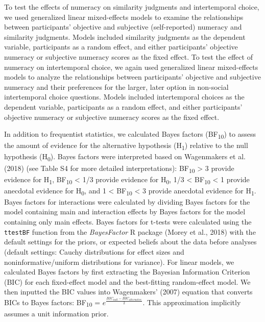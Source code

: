 \documentclass[
  pub,floatsintext]{apa6}
\begin{document}
To test the effects of numeracy on similarity judgments and intertemporal choice, we used generalized linear mixed-effects models to examine the relationships between participants' objective and subjective (self-reported) numeracy and similarity judgments. Models included similarity judgments as the dependent variable, participants as a random effect, and either participants' objective numeracy or subjective numeracy scores as the fixed effect. To test the effect of numeracy on intertemporal choice, we again used generalized linear mixed-effects models to analyze the relationships between participants' objective and subjective numeracy and their preferences for the larger, later option in non-social intertemporal choice questions. Models included intertemporal choices as the dependent variable, participants as a random effect, and either participants' objective numeracy or subjective numeracy scores as the fixed effect.

In addition to frequentist statistics, we calculated Bayes factors (BF\textsubscript{10}) to assess the amount of evidence for the alternative hypothesis (H\textsubscript{1}) relative to the null hypothesis (H\textsubscript{0}). Bayes factors were interpreted based on Wagenmakers et al. (2018) (see Table S4 for more detailed interpretations): BF\textsubscript{10} \textgreater{} 3 provide evidence for H\textsubscript{1}, BF\textsubscript{10} \textless{} 1/3 provide evidence for H\textsubscript{0}, 1/3 \textless{} BF\textsubscript{10} \textless{} 1 provide anecdotal evidence for H\textsubscript{0}, and 1 \textless{} BF\textsubscript{10} \textless{} 3 provide anecdotal evidence for H\textsubscript{1}. Bayes factors for interactions were calculated by dividing Bayes factors for the model containing main and interaction effects by Bayes factors for the model containing only main effects. Bayes factors for t-tests were calculated using the \texttt{ttestBF} function from the \emph{BayesFactor} R package (Morey et al., 2018) with the default settings for the priors, or expected beliefs about the data before analyses (default settings: Cauchy distributions for effect sizes and noninformative/uniform distributions for variance). For linear models, we calculated Bayes factors by first extracting the Bayesian Information Criterion (BIC) for each fixed-effect model and the best-fitting random-effect model. We then inputted the BIC values into Wagenmakers' (2007) equation that converts BICs to Bayes factors: BF\textsubscript{10} = \(e^{\frac{BIC_{null} - BIC_{alternative}}{2}}\). This approximation implicitly assumes a unit information prior.
\end{document}
